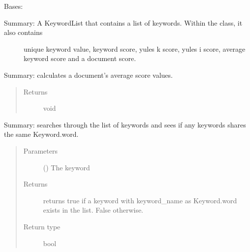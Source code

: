 \documentclass[letterpaper,10pt,english]{sphinxmanual}
\begin{document}
\begin{fulllineitems}
\label{\detokenize{KeywordList:KeywordList.KeywordList}}
Bases: 
\begin{description}
\item[{Summary: A KeywordList that contains a list of keywords. Within the class, it also contains}] \leavevmode
unique keyword value, keyword score, yules k score, yules i score, average keyword 
score and a document score.

\end{description}

\begin{fulllineitems}
\label{\detokenize{KeywordList:KeywordList.KeywordList.calculateavgscores}}
Summary: calculates a document’s average score values.
\begin{quote}\begin{description}
\item[{Returns}] \leavevmode
void

\end{description}\end{quote}

\end{fulllineitems}


\begin{fulllineitems}
\label{\detokenize{KeywordList:KeywordList.KeywordList.existsinlist}}
Summary: searches through the list of keywords and sees if any keywords shares the same Keyword.word.
\begin{quote}\begin{description}
\item[{Parameters}] \leavevmode
{} () \textendash{} The keyword

\item[{Returns}] \leavevmode
returns true if a keyword with keyword\_name as Keyword.word exists in the list. False otherwise.

\item[{Return type}] \leavevmode
bool

\end{description}\end{quote}


\end{fulllineitems}
\end{fulllineitems}
\end{document}
